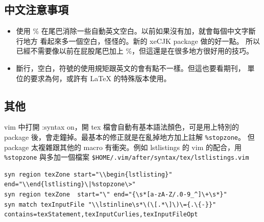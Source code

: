 \subsection{中文注意事項}
\begin{itemize}
\item 使用 \% 在尾巴消除一些自動英文空白。以前如果沒有加，就會每個中文字斷行地方
看起來多一個空白，怪怪的。新的 xeCJK package 做的好一點。
所以已經不需要像以前在屁股尾巴加上 \%，但這還是在很多地方很好用的技巧。
\item 斷行，空白，符號的使用規矩跟英文的會有點不一樣。但這也要看期刊，
單位的要求為何，或許有 {\LaTeX} 的特殊版本使用。
\end{itemize}

\subsection{其他}
vim 中打開 :syntax on，開 tex 檔會自動有基本語法顏色，可是用上特別的
 package 後，會走鐘掉。最基本的修正就是在亂掉地方加上註解 
\verb=%stopzone=。 但 package 太複雜跟其他的 macro 有衝突。例如 lstlistings
的 vim 的配合，用 \verb=%stopzone= 與多加一個檔案
\verb=$HOME/.vim/after/syntax/tex/lstlistings.vim=
\begin{footnotesize}
\begin{verbatim}
syn region texZone start="\\begin{lstlisting}" end="\\end{lstlisting}\|%stopzone\>"
syn region texZone  start="\" end="{\s*[a-zA-Z/.0-9_^]\+\s*}"
syn match texInputFile "\\lstinline\s*\(\[.*\]\)\={.\{-}}" contains=texStatement,texInputCurlies,texInputFileOpt
\end{verbatim}
\end{footnotesize}
